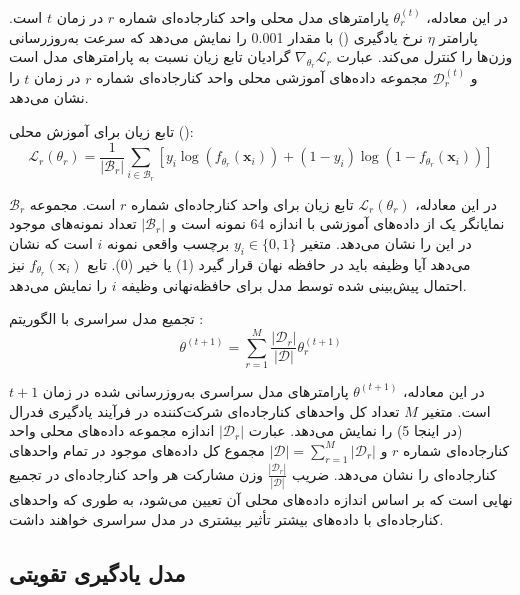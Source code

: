 \documentclass[11pt]{article}
\begin{document}
در این معادله، $\theta_r^{(t)}$ پارامترهای مدل محلی واحد کنارجاده‌ای شماره $r$ در زمان $t$ است. پارامتر $\eta$ نرخ یادگیری () با مقدار 0.001 را نمایش می‌دهد که سرعت به‌روزرسانی وزن‌ها را کنترل می‌کند. عبارت $\nabla_{\theta_r} \mathcal{L}_r$ گرادیان تابع زیان نسبت به پارامترهای مدل است و $\mathcal{D}_r^{(t)}$ مجموعه داده‌های آموزشی محلی واحد کنارجاده‌ای شماره $r$ در زمان $t$ را نشان می‌دهد.

تابع زیان برای آموزش محلی ():
\begin{equation}
\mathcal{L}_r(\theta_r) = \frac{1}{|\mathcal{B}_r|} \sum_{i \in \mathcal{B}_r} \left[ y_i \log(f_{\theta_r}(\mathbf{x}_i)) + (1-y_i) \log(1-f_{\theta_r}(\mathbf{x}_i)) \right]
\label{eq:loss_function}
\end{equation}

در این معادله، $\mathcal{L}_r(\theta_r)$ تابع زیان  برای واحد کنارجاده‌ای شماره $r$ است. مجموعه $\mathcal{B}_r$ نمایانگر یک  از داده‌های آموزشی با اندازه 64 نمونه است و $|\mathcal{B}_r|$ تعداد نمونه‌های موجود در این  را نشان می‌دهد. متغیر $y_i \in \{0, 1\}$ برچسب واقعی نمونه $i$ است که نشان می‌دهد آیا وظیفه باید در حافظه نهان قرار گیرد (1) یا خیر (0). تابع $f_{\theta_r}(\mathbf{x}_i)$ نیز احتمال پیش‌بینی شده توسط مدل برای حافظه‌نهانی وظیفه $i$ را نمایش می‌دهد.

تجمیع مدل سراسری با الگوریتم :
\begin{equation}
\theta^{(t+1)} = \sum_{r=1}^{M} \frac{|\mathcal{D}_r|}{|\mathcal{D}|} \theta_r^{(t+1)}
\label{eq:fedavg}
\end{equation}

در این معادله، $\theta^{(t+1)}$ پارامترهای مدل سراسری به‌روزرسانی شده در زمان $t+1$ است. متغیر $M$ تعداد کل واحدهای کنارجاده‌ای شرکت‌کننده در فرآیند یادگیری فدرال (در اینجا 5) را نمایش می‌دهد. عبارت $|\mathcal{D}_r|$ اندازه مجموعه داده‌های محلی واحد کنارجاده‌ای شماره $r$ و $|\mathcal{D}| = \sum_{r=1}^{M} |\mathcal{D}_r|$ مجموع کل داده‌های موجود در تمام واحدهای کنارجاده‌ای را نشان می‌دهد. ضریب $\frac{|\mathcal{D}_r|}{|\mathcal{D}|}$ وزن مشارکت هر واحد کنارجاده‌ای در تجمیع نهایی است که بر اساس اندازه داده‌های محلی آن تعیین می‌شود، به طوری که واحدهای کنارجاده‌ای با داده‌های بیشتر تأثیر بیشتری در مدل سراسری خواهند داشت.

\subsection{مدل یادگیری تقویتی}
\end{document}
